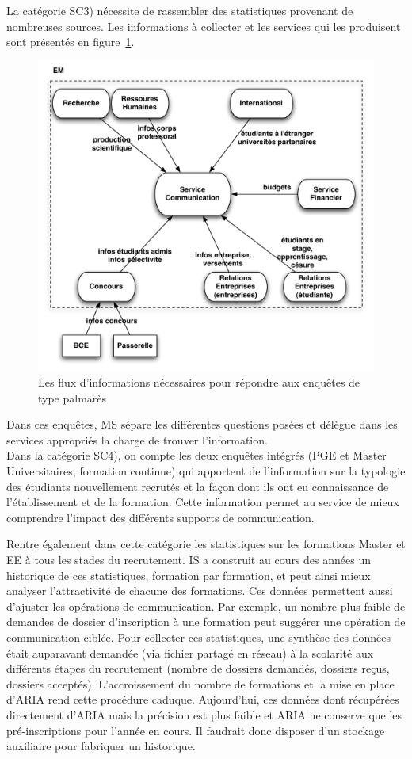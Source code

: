 \documentclass{book}
\begin{document}
La catégorie SC3) nécessite de rassembler des statistiques provenant de 
nombreuses sources. Les informations à collecter et les services qui les 
produisent sont présentés en figure~\ref{fg:comm_flux}.
\begin{figure}[hbt]
\begin{center}
\includegraphics[width=.75\linewidth]{figs/comm_flux.pdf}
\end{center}
\caption{Les flux d'informations nécessaires pour répondre aux enquêtes de type palmarès}
\label{fg:comm_flux}
\end{figure}
Dans ces enquêtes, MS sépare les différentes questions posées et délègue
dans les services appropriés la charge de trouver l'information.\\


Dans la catégorie SC4), on compte les deux enquêtes intégrés (PGE et Master 
Universitaires, formation continue) qui apportent de l'information sur la 
typologie des étudiants nouvellement recrutés et la façon dont ils ont eu 
connaissance de l'établissement et de la formation. Cette information permet 
au service de mieux comprendre l'impact des différents supports de communication.

Rentre également dans cette catégorie les statistiques sur les formations
Master et EE à tous les stades du recrutement. IS a construit au cours 
des années un historique de ces statistiques, formation par formation,
et peut ainsi mieux analyser l'attractivité de chacune des formations.
Ces données permettent aussi d'ajuster les opérations de communication.
Par exemple, un nombre plus faible de demandes de dossier d'inscription 
à une formation peut suggérer une opération de communication ciblée.
Pour collecter ces statistiques, une synthèse des données était auparavant
demandée (via fichier partagé en réseau) à la scolarité aux différents 
étapes du recrutement (nombre de dossiers demandés, dossiers reçus, 
dossiers acceptés). 
L'accroissement du nombre de formations et la mise en place d'ARIA rend 
cette procédure caduque. Aujourd'hui, ces données dont récupérées
directement d'ARIA mais la précision est plus faible et ARIA ne 
conserve que les pré-inscriptions pour l'année en cours. Il faudrait
donc disposer d'un stockage auxiliaire pour fabriquer un historique.
\end{document}
